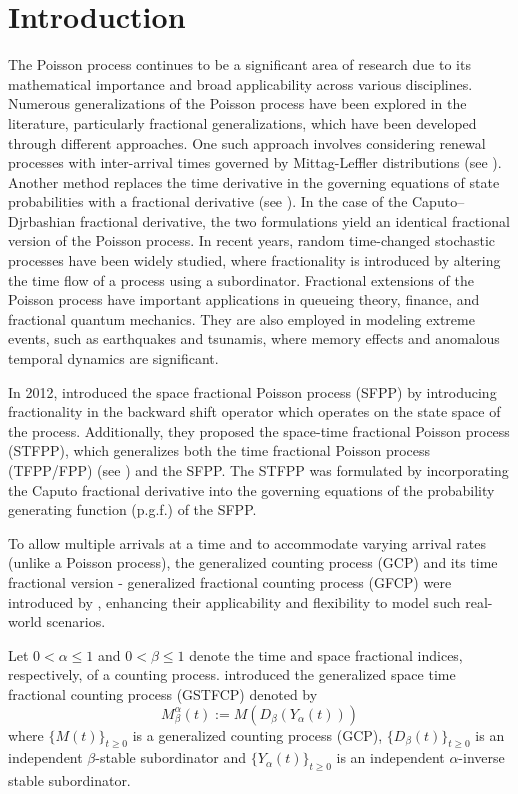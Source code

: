 \documentclass[11pt,oneside,reqno]{amsart}
\theoremstyle{definition}
\theoremstyle{remarkstyle}
\begin{document}
\section{Introduction}
The Poisson process continues to be a significant area of research due to its mathematical importance and broad applicability across various disciplines. Numerous generalizations of the Poisson process have been explored in the literature, particularly fractional generalizations, which have been developed through different approaches. One such approach involves considering renewal processes with inter-arrival times governed by Mittag-Leffler distributions (see \citet{Mainardi2004}). Another method replaces the time derivative in the governing equations of state probabilities with a fractional derivative (see \citet{Beghin2009}). In the case of the Caputo–Djrbashian fractional derivative, the two formulations yield an identical fractional version of the Poisson process. In recent years, random time-changed stochastic processes have been widely studied, where fractionality is introduced by altering the time flow of a process using a subordinator. Fractional extensions of the Poisson process have important applications in queueing theory, finance, and fractional quantum mechanics. They are also employed in modeling extreme events, such as earthquakes and tsunamis, where memory effects and anomalous temporal dynamics are significant.

In 2012, \citet{Orsingher2012} introduced the space fractional Poisson process (SFPP) by introducing fractionality in the backward shift operator which operates on the state space of the process. Additionally, they proposed the space-time fractional Poisson process (STFPP), which generalizes both  the time fractional Poisson process (TFPP/FPP) (see \citet{LASKIN2003}) and the SFPP. The STFPP was formulated by incorporating the Caputo fractional derivative into the governing equations of the probability generating function (p.g.f.) of the SFPP.

To allow multiple arrivals at a time and to accommodate varying arrival rates (unlike a Poisson process), the generalized counting process (GCP) and its time fractional version - generalized fractional counting process (GFCP) were introduced by \citet{Crescenzo2016}, enhancing their applicability and flexibility to model such real-world scenarios. 

Let $0<\alpha\le 1$ and $0<\beta\le 1$ denote the time and space fractional indices, respectively, of a counting process. \citet{Katariaarxiv} introduced the generalized space time fractional counting process (GSTFCP) denoted by
\begin{equation}\label{definition.GSTFCP}
    M_{\beta}^{\alpha}(t):=M(D_\beta(Y_\alpha(t)))
\end{equation}
where $\{M(t)\}_{t\geq 0}$ is a generalized counting process (GCP), $\{D_\beta(t)\}_{t\geq 0}$ is an independent $\beta$-stable subordinator and $\{Y_\alpha(t)\}_{t\geq 0}$ is an independent $\alpha$-inverse stable subordinator. 
\end{document}
